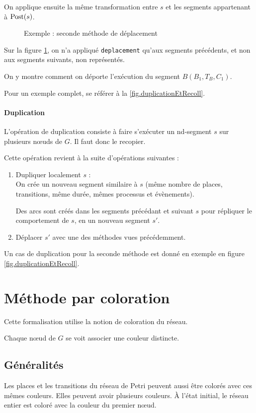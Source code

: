 On applique ensuite la même transformation entre $s$ et les segments appartenant à $\operatorname{Post}(s)$.

\begin{figure}[H]
\centering

\caption{Exemple : seconde méthode de déplacement}
\label{fig:deplacementForm2}
\end{figure}

Sur la figure \ref{fig:deplacementForm2}, on n'a appliqué \texttt{deplacement} qu'aux segments précédents, et non aux segments suivants, non représentés.

On y montre comment on déporte l'exécution du segment $B(B_1, T_B, C_1)$.

Pour un exemple complet, se référer à la \cref{fig.duplicationEtRecoll}.

\paragraph{Duplication}
L'opération de duplication consiste à faire s'exécuter un nd-segment $s$ sur plusieurs nœuds de $G$. Il faut donc le recopier.

Cette opération revient à la suite d'opérations suivantes : 
\begin{enumerate}
\item Dupliquer localement $s$ : \\
		On crée un nouveau segment similaire à $s$ (même nombre de places, transitions, même durée, mêmes processus et évènements).
		
		Des arcs sont créés dans les segments précédant et suivant $s$ pour répliquer le comportement de $s$, en un nouveau segment $s'$.
\item Déplacer $s'$ avec une des méthodes vues précédemment.
\end{enumerate}

Un cas de duplication pour la seconde méthode est donné en exemple en figure \ref{fig.duplicationEtRecoll}.

\section{Méthode par coloration}
Cette formalisation utilise la notion de coloration du réseau.

Chaque nœud de $G$ se voit associer une couleur distincte.

\subsection{Généralités}
Les places et les transitions du réseau de Petri peuvent aussi être colorés avec ces mêmes couleurs. Elles peuvent avoir plusieurs couleurs.
À l'état initial, le réseau entier est coloré avec la couleur du premier nœud.

